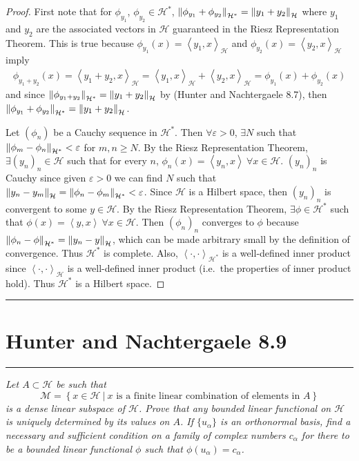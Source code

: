 \documentclass{article} %
\theoremstyle{plain}
\newcommand{\E}{\varepsilon}
\newcommand{\VEC}[2]{\left\langle #1, #2 \right\rangle}
\newcommand{\problem}[1]{
\vspace{.375cm}
\begin{minipage}{\textwidth}
    \begin{center}
        \noindent\rule{5cm}{1pt}
    \end{center}
    \section{\bf #1}
    \begin{center}
        \noindent\rule{5cm}{1pt}
    \end{center}
    \vspace{0.25cm}
\end{minipage}
}
\numberwithin{equation}{section} %
\numberwithin{figure}{section} %
\numberwithin{table}{section} %
\begin{document}
\begin{proof}
    First note that for $\phi_{y_1}$, $\phi_{y_2} \in \mathcal{H}^*$, $\norm{\phi_{y_1} + \phi_{y_2}}_{\mathcal{H}^*} = \norm{y_1 + y_2}_{\mathcal{H}}$ where $y_1$ and $y_2$ are the associated vectors in $\mathcal{H}$ guaranteed in the Riesz Representation Theorem.  This is true because $\phi_{y_1}(x) = \VEC{y_1}{x}_{\mathcal{H}}$ and $\phi_{y_2}(x) = \VEC{y_2}{x}_{\mathcal{H}}$ imply
    \begin{align*}
         \phi_{y_1 + y_2}(x) = \VEC{y_1 + y_2}{x}_{\mathcal{H}} = \VEC{y_1}{x}_{\mathcal{H}} + \VEC{y_2}{x}_{\mathcal{H}} = \phi_{y_1}(x) + \phi_{y_2}(x)
    \end{align*}
    and since $\norm{\phi_{y_1 + y_2}}_{\mathcal{H}^*} = \norm{y_1 + y_2}_{\mathcal{H}}$ by (Hunter and Nachtergaele 8.7), then $\norm{\phi_{y_1} + \phi_{y_2}}_{\mathcal{H}^*} = \norm{y_1 + y_2}_{\mathcal{H}}$.

    Let $(\phi_n)$ be a Cauchy sequence in $\mathcal{H}^*$.  Then $\forall \E > 0$, $\exists N$ such that $\norm{\phi_m - \phi_n}_{\mathcal{H}^*} < \E$ for $m, n \geq N$.  By the Riesz Representation Theorem, $\exists (y_n)_n \in \mathcal{H}$ such that for every $n$, $\phi_n(x) = \VEC{y_n}{x}\ \forall x \in \mathcal{H}$.  $(y_n)_n$ is Cauchy since given $\E > 0$ we can find $N$ such that $\norm{y_n - y_m}_{\mathcal{H}} = \norm{\phi_n - \phi_m}_{\mathcal{H}^*} < \E$.  Since $\mathcal{H}$ is a Hilbert space, then $(y_n)_n$ is convergent to some $y \in \mathcal{H}$.  By the Riesz Representation Theorem, $\exists \phi \in \mathcal{H}^*$ such that $\phi(x) = \VEC{y}{x}\ \forall x \in \mathcal{H}$.  Then $(\phi_n)_n$ converges to $\phi$ because $\norm{\phi_n - \phi}_{\mathcal{H}^*} = \norm{y_n - y}_\mathcal{H}$, which can be made arbitrary small by the definition of convergence.  Thus $\mathcal{H}^*$ is complete.  Also, $\VEC{\cdot}{\cdot}_{\mathcal{H}^*}$ is a well-defined inner product since $\VEC{\cdot}{\cdot}_\mathcal{H}$ is a well-defined inner product (i.e.~the properties of inner product hold).  Thus $\mathcal{H}^*$ is a Hilbert space.
\end{proof}









\problem{Hunter and Nachtergaele 8.9}
\emph{Let $A \subset \mathcal{H}$ be such that $$\mathcal{M} = \left\{x \in \mathcal{H}\ |\ x \text{ is a finite linear combination of elements in $A$}\right\}$$ is a dense linear subspace of $\mathcal{H}$.  Prove that any bounded linear functional on $\mathcal{H}$ is uniquely determined by its values on $A$.  If $\{u_\alpha\}$ is an orthonormal basis, find a necessary and sufficient condition on a family of complex numbers $c_\alpha$ for there to be a bounded linear functional $\phi$ such that $\phi(u_\alpha) = c_\alpha$.} \\
\end{document}
